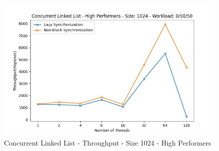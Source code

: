\documentclass[../final_report.tex]{subfiles}
\begin{document}
\begin{figure}[H]
        \includegraphics[scale=0.4]{outFiles/plots/concurrent_data_structs_high_1024_0_50_50.jpg}
    \caption{Concurrent Linked List - Throughput - Size 1024 - High Performers}
    \label{fig:Concurrent Linked List - Throughput - Size 1024 - High Performers}
\end{figure}
\end{document}
